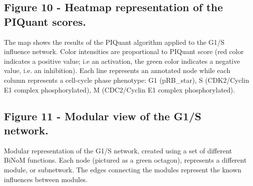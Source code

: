 \documentclass[10pt]{bmc_article}
\newenvironment{bmcformat}{\baselineskip20pt\sloppy\setboolean{publ}{false}}{\baselineskip20pt\sloppy}
\begin{document}
\begin{bmcformat}
  \subsection*{Figure 10 - Heatmap representation of the PIQuant scores.}
The map shows the results of the PIQuant algorithm applied to the G1/S
influence network. Color intensities are proportional to PIQuant score (red color indicates a positive
value; i.e an activation, the green color indicates a negative value, i.e. an
inhibition).
Each line represents an annotated node while each column represents a cell-cycle
phase phenotype: G1 (pRB\_star), S (CDK2/Cyclin E1 complex phosphorylated), M (CDC2/Cyclin E1 complex phosphorylated).

  \subsection*{Figure 11 - Modular view of the G1/S network.}
Modular representation of the G1/S network, created using a set of
different BiNoM functions. Each node (pictured as a green octagon), represents a
different module, or subnetwork. The edges connecting the modules represent the
 known influences between modules.






\end{bmcformat}
\end{document}
